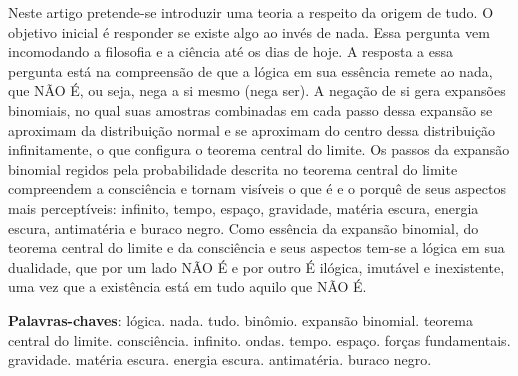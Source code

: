 \vspace{-15mm}
\maketitle
\vspace{-8mm}
\begin{resumoumacoluna}
\vspace{-2mm}
	Neste artigo pretende-se introduzir uma teoria a respeito da origem de tudo. O objetivo inicial é responder se existe algo ao invés de nada. Essa pergunta vem incomodando a filosofia e a ciência até os dias de hoje. A resposta a essa pergunta está na compreensão de que a lógica em sua essência remete ao nada, que NÃO É, ou seja, nega a si mesmo (nega ser). A negação de si gera expansões binomiais, no qual suas amostras combinadas em cada passo dessa expansão se aproximam da distribuição normal e se aproximam do centro dessa distribuição infinitamente, o que configura o teorema central do limite. Os passos da expansão binomial regidos pela probabilidade descrita no teorema central do limite compreendem a consciência e tornam visíveis o que é e o porquê de seus aspectos mais perceptíveis: infinito, tempo, espaço, gravidade, matéria escura, energia escura, antimatéria e buraco negro. Como essência da expansão binomial, do teorema central do limite e da consciência e seus aspectos tem-se a lógica em sua dualidade, que por um lado NÃO É e por outro É ilógica, imutável e inexistente, uma vez que a existência está em tudo aquilo que NÃO É. 
 \vspace{\onelineskip} 
 \noindent
 
 \textbf{Palavras-chaves}: lógica. nada. tudo. binômio. expansão binomial. teorema central do limite. consciência. infinito. ondas. tempo. espaço. forças fundamentais. gravidade. matéria escura. energia escura. antimatéria. buraco negro.
\end{resumoumacoluna}

